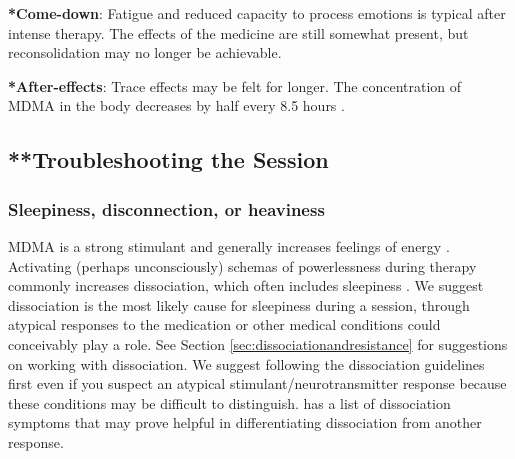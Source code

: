 \documentclass[12pt,letterpaper]{article}
\begin{document}
\textbf{*Come-down}: 
Fatigue and reduced capacity to process emotions is typical after intense therapy. The effects of the medicine are still somewhat present, but reconsolidation may no longer be achievable.

\textbf{*After-effects}:
Trace effects may be felt for longer. The concentration of MDMA in the body decreases by half every 8.5 hours \cite{torrePharmacology}.

\subsection{**Troubleshooting the Session}
\label{sec:troubleshooting}
\subsubsection{Sleepiness, disconnection, or heaviness}
MDMA is a strong stimulant and generally increases feelings of energy \cite{vizeliActuteEffects}. Activating (perhaps unconsciously) schemas of powerlessness during therapy commonly increases dissociation, which often includes sleepiness \cite{kozlowskaDefenseCascade}. We suggest dissociation is the most likely cause for sleepiness during a session, through atypical responses to the medication or other medical conditions could conceivably play a role. See Section \ref{sec:dissociationandresistance} for suggestions on working with dissociation. We suggest following the dissociation guidelines first even if you suspect an atypical stimulant/neurotransmitter response because these conditions may be difficult to distinguish. \textcite{cheetahSigns} has a list of dissociation symptoms that may prove helpful in differentiating dissociation from another response.
\end{document}
